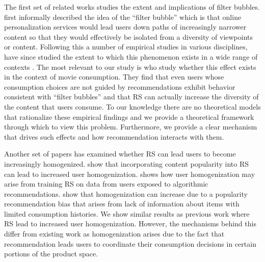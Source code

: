 \documentclass[manuscript]{acmart}
\newcommand{\xhdr}[1]{\vspace{1mm} \noindent{\bf #1}}
\begin{document}
\par
\xhdr{Related Work.} 
The first set of related works studies the extent and implications of filter bubbles. \cite{pariser2011filter} first informally described the idea of the ``filter bubble'' which is that online personalization services would lead users down paths of increasingly narrower content so that they would effectively be isolated from a diversity of viewpoints or content. Following this\dgedit{,} a number of empirical studies in various disciplines, have since studied the extent to which this phenomenon exists in a wide range of contexts \cite{flaxman2016filter,hosanagar2013will,moller2018blame,nguyen2014exploring}. The most relevant to our study is \cite{nguyen2014exploring} who study whether this effect exists in the context of movie consumption. They find that even users whose consumption choices are not guided by recommendations exhibit behavior consistent with ``filter bubbles'' and that RS can actually increase the diversity of the content that users consume. To our knowledge there are no theoretical models that rationalize these empirical findings and we provide a theoretical framework through which to view this problem. Furthermore, we provide a clear mechanism that drives such effects and how recommendation interacts with them.
\par 
Another set of papers has examined whether RS can lead users to become increasingly homogenized. \cite{celma2008hits, treviranus2009value} show that incorporating content popularity into RS can lead to increased user homogenization. \cite{chaney2018algorithmic} shows how user homogenization may arise from training RS on data from users exposed to algorithmic recommendations. \cite{fleder2009blockbuster} show that homogenization can increase due to a popularity recommendation bias that arises from lack of information about items with limited consumption histories. We show similar results as previous work where RS lead to increased user homogenization. However, the mechanisms behind this differ from existing work as homogenization arises due to the fact that recommendation leads users to coordinate their consumption decisions in certain portions of the product space.
\par
\end{document}
